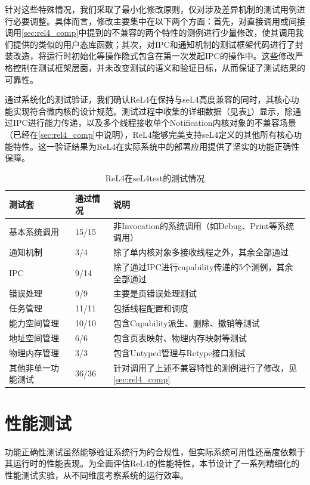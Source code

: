 针对这些特殊情况，我们采取了最小化修改原则，仅对涉及差异机制的测试用例进行必要调整。具体而言，修改主要集中在以下两个方面：首先，对直接调用或间接调用\ref{sec:rel4_comp}中提到的不兼容的两个特性的测例进行少量修改，使其调用我们提供的类似的用户态库函数；其次，对IPC和通知机制的测试框架代码进行了封装改造，将运行时初始化等操作隐式包含在第一次发起IPC的操作中。这些修改严格控制在测试框架层面，并未改变测试的语义和验证目标，从而保证了测试结果的可靠性。

通过系统化的测试验证，我们确认ReL4在保持与seL4高度兼容的同时，其核心功能实现符合微内核的设计规范。测试过程中收集的详细数据（见表\ref{tab:seL4_test_info}）显示，除通过IPC进行能力传递，以及多个线程接收单个Notification内核对象的不兼容场景（已经在\ref{sec:rel4_comp}中说明），ReL4能够完美支持seL4定义的其他所有核心功能特性。这一验证结果为ReL4在实际系统中的部署应用提供了坚实的功能正确性保障。


\begin{table}[htbp]
    \centering
    \caption{ReL4在seL4test的测试情况} 
    \begin{tabular*}{1.0\textwidth}{@{\extracolsep{\fill}}lll}
    \toprule
    测试套			&通过情况 &说明	 \\
    \midrule
    基本系统调用			&15/15 & 非Invocation的系统调用（如Debug、Print等系统调用） \\
      通知机制			&3/4 & 除了单内核对象多接收线程之外，其余全部通过	 \\
      IPC &9/14 & 除了通过IPC进行capability传递的5个测例，其余全部通过	 \\
      错误处理  &9/9 & 主要是页错误处理测试\\
      任务管理	&11/11 & 包括线程配置和调度 \\
      能力空间管理 &10/10 & 包含Capability派生、删除、撤销等测试\\
      地址空间管理 &6/6 & 包含页表映射、物理内存映射等测试 \\
      物理内存管理 &3/3 & 包含Untyped管理与Retype接口测试  \\
      其他非单一功能测试 & 36/36 & 针对调用了上述不兼容特性的测例进行了修改，见\ref{sec:rel4_comp} \\
    \bottomrule
    \end{tabular*}
    \label{tab:seL4_test_info}
  \end{table}

\section{性能测试}
功能正确性测试虽然能够验证系统行为的合规性，但实际系统可用性还高度依赖于其运行时的性能表现。为全面评估ReL4的性能特性，本节设计了一系列精细化的性能测试实验，从不同维度考察系统的运行效率。

